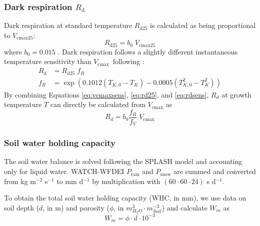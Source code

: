 \documentclass{myreport}
\newcommand{\vcmax}{$V_{\text{cmax}}$}
\begin{document}
\subsubsection{Dark respiration $R_{\mathrm{d}}$}
\label{sec:rd}
Dark respiration at standard temperature $R_{\mathrm{d25}}$ is calculated as being proportional to $V_{\mathrm{cmax25}}$:
\begin{equation}
\label{eq:rd25}
    R_{\mathrm{d25}} = b_0 \; V_{\mathrm{cmax25}}
\end{equation}
where $b_0 = 0.015$ \citep{atkin15}. Dark respiration follows a slightly different instantaneous temperature sensitivity than \vcmax\ following \cite{heskel16}:
\begin{align}
\label{eq:rdsens}
    R_{\mathrm{d}} &=  R_{\mathrm{d25}}\; f_R  \\
    f_R &= \exp \left(  0.1012(T_{K,0}-T_K) - 0.0005(T_{K,0}^2-T_K^2) \right) 
\end{align}
By combining Equations \ref{eq:vcmaxsens}, \ref{eq:rd25}, and \ref{eq:rdsens}, $R_d$ at growth temperature $T$ can directly be calculated from $V_{\mathrm{cmax}}$ as
\begin{equation}
    R_d = b_0 \frac{f_R}{f_V}\;V_{\mathrm{cmax}}
\end{equation}

\subsubsection{Soil water holding capacity}
\label{sec:whc}
The soil water balance is solved following the SPLASH model and accounting only for liquid water. WATCH-WFDEI $P_{\text{rain}}$ and $P_{\text{snow}}$ are summed and converted from kg m$^{-2}$ s$^{-1}$ to mm d$^{-1}$ by multiplication with $(60 \cdot 60 \cdot 24)$ s d$^{-1}$. 



To obtain the total soil water holding capacity (WHC, in mm), we use data on soil depth ($d$, in m) and porosity ($\phi$, in $m_{H_{2}O}^{3} \cdot m_{Soil}^{-3}$) and calculate $W_m$ as
\begin{equation}
    W_m = \phi \cdot d \cdot 10^{-3}
\end{equation}
\end{document}
